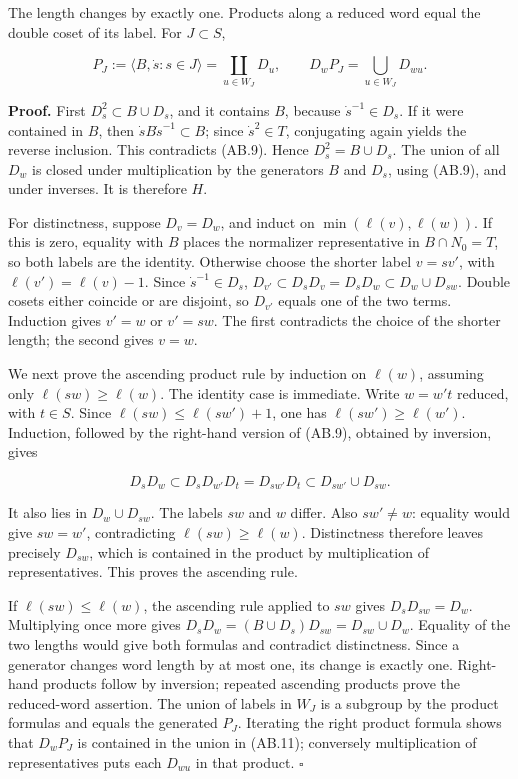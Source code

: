 \documentclass[
  11pt,
]{article}
\begin{document}
The length changes by exactly one. Products along a reduced word equal
the double coset of its label. For \(J\subset S\),

\[
 P_J:=\langle B,\dot s:s\in J\rangle
       =\coprod_{u\in W_J}D_u,
 \qquad D_wP_J=\bigcup_{u\in W_J}D_{wu}.
 \tag{AB.11}
\]

\textbf{Proof.} First \(D_s^2\subset B\cup D_s\), and it contains \(B\),
because \(\dot s^{-1}\in D_s\). If it were contained in \(B\), then
\(\dot sB\dot s^{-1}\subset B\); since \(\dot s^2\in T\), conjugating
again yields the reverse inclusion. This contradicts (AB.9). Hence
\(D_s^2=B\cup D_s\). The union of all \(D_w\) is closed under
multiplication by the generators \(B\) and \(D_s\), using (AB.9), and
under inverses. It is therefore \(H\).

For distinctness, suppose \(D_v=D_w\), and induct on
\(\min(\ell(v),\ell(w))\). If this is zero, equality with \(B\) places
the normalizer representative in \(B\cap N_0=T\), so both labels are the
identity. Otherwise choose the shorter label \(v=sv'\), with
\(\ell(v')=\ell(v)-1\). Since \(\dot s^{-1}\in D_s\),
\(D_{v'}\subset D_sD_v=D_sD_w\subset D_w\cup D_{sw}\). Double cosets
either coincide or are disjoint, so \(D_{v'}\) equals one of the two
terms. Induction gives \(v'=w\) or \(v'=sw\). The first contradicts the
choice of the shorter length; the second gives \(v=w\).

We next prove the ascending product rule by induction on \(\ell(w)\),
assuming only \(\ell(sw)\ge\ell(w)\). The identity case is immediate.
Write \(w=w't\) reduced, with \(t\in S\). Since
\(\ell(sw)\le\ell(sw')+1\), one has \(\ell(sw')\ge\ell(w')\). Induction,
followed by the right-hand version of (AB.9), obtained by inversion,
gives

\[
 D_sD_w\subset D_sD_{w'}D_t
       =D_{sw'}D_t\subset D_{sw'}\cup D_{sw}.
\]

It also lies in \(D_w\cup D_{sw}\). The labels \(sw\) and \(w\) differ.
Also \(sw'\ne w\): equality would give \(sw=w'\), contradicting
\(\ell(sw)\ge\ell(w)\). Distinctness therefore leaves precisely
\(D_{sw}\), which is contained in the product by multiplication of
representatives. This proves the ascending rule.

If \(\ell(sw)\le\ell(w)\), the ascending rule applied to \(sw\) gives
\(D_sD_{sw}=D_w\). Multiplying once more gives
\(D_sD_w=(B\cup D_s)D_{sw}=D_{sw}\cup D_w\). Equality of the two lengths
would give both formulas and contradict distinctness. Since a generator
changes word length by at most one, its change is exactly one.
Right-hand products follow by inversion; repeated ascending products
prove the reduced-word assertion. The union of labels in \(W_J\) is a
subgroup by the product formulas and equals the generated \(P_J\).
Iterating the right product formula shows that \(D_wP_J\) is contained
in the union in (AB.11); conversely multiplication of representatives
puts each \(D_{wu}\) in that product. \(\square\)
\end{document}
